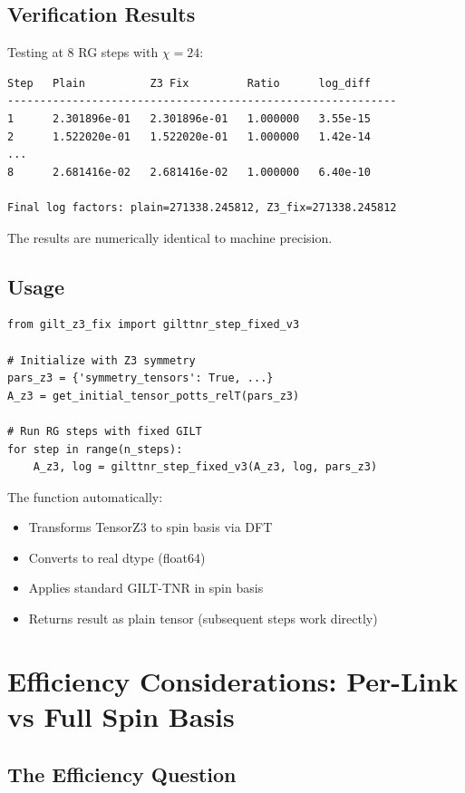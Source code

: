 \documentclass{article}
\begin{document}
\subsection{Verification Results}

Testing at 8 RG steps with $\chi = 24$:
\begin{verbatim}
Step   Plain          Z3 Fix         Ratio      log_diff
------------------------------------------------------------
1      2.301896e-01   2.301896e-01   1.000000   3.55e-15
2      1.522020e-01   1.522020e-01   1.000000   1.42e-14
...
8      2.681416e-02   2.681416e-02   1.000000   6.40e-10

Final log factors: plain=271338.245812, Z3_fix=271338.245812
\end{verbatim}

The results are numerically identical to machine precision.

\subsection{Usage}

\begin{lstlisting}
from gilt_z3_fix import gilttnr_step_fixed_v3

# Initialize with Z3 symmetry
pars_z3 = {'symmetry_tensors': True, ...}
A_z3 = get_initial_tensor_potts_relT(pars_z3)

# Run RG steps with fixed GILT
for step in range(n_steps):
    A_z3, log = gilttnr_step_fixed_v3(A_z3, log, pars_z3)
\end{lstlisting}

The function automatically:
\begin{itemize}
    \item Transforms TensorZ3 to spin basis via DFT
    \item Converts to real dtype (float64)
    \item Applies standard GILT-TNR in spin basis
    \item Returns result as plain tensor (subsequent steps work directly)
\end{itemize}

\section{Efficiency Considerations: Per-Link vs Full Spin Basis}

\subsection{The Efficiency Question}
\end{document}
